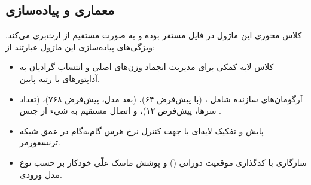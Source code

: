 \subsection{معماری و پیاده‌سازی}
کلاس محوری این ماژول  در فایل  مستقر بوده و به صورت مستقیم از  ارث‌بری می‌کند. ویژگی‌های پیاده‌سازی این ماژول عبارتند از:
\begin{itemize}
    \item کلاس لایه کمکی  برای مدیریت انجماد وزن‌های اصلی و انتساب گرادیان به آداپتورهای با رتبه پایین.
    \item آرگومان‌های سازنده شامل ،  (با پیش‌فرض ۶۴)،  (بعد مدل، پیش‌فرض ۷۶۸)،  (تعداد سرها، پیش‌فرض ۱۲)، و اتصال مستقیم به شیء  از جنس .
    \item پایش و تفکیک لایه‌ای با  جهت کنترل نرخ هرس گام‌به‌گام در عمق شبکه ترنسفورمر.
    \item سازگاری با کدگذاری موقعیت دورانی () و پوشش ماسک علّی خودکار بر حسب نوع مدل ورودی.
\end{itemize}
